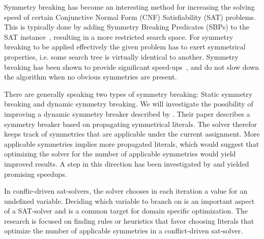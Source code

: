 Symmetry breaking has become an interesting method for increasing the solving speed of
certain Conjunctive Normal Form (CNF) Satisfiability (SAT) problems.
This is typically done by adding Symmetry Breaking Predicates (SBPs) to the SAT
instance~\cite{sakallah2009symmetry}, resulting in a more restricted search space.
For symmetry breaking to be applied effectively the given problem has to exert symmetrical
properties, i.e. some search tree is virtually identical to another.
Symmetry breaking has been shown to provide significant
speed-ups~\cite{darga2004exploiting,aloul2003solving}, and do not slow down the algorithm
when no obvious symmetries are present.

There are generally speaking two types of symmetry breaking: Static symmetry breaking and
dynamic symmetry breaking.
We will investigate the possibility of improving a dynamic symmetry breaker described by
\cite{devriendt2012symmetry}.
Their paper describes a symmetry breaker based on propagating symmetrical literals.
The solver therefor keeps track of symmetries that are applicable under the current assignment.
More applicable symmetries implies more propagated literals, which would suggest that
optimizing the solver for the number of applicable symmetries would yield improved results.
A step in this direction has been investigated by \cite{devriendt2012symmetry} and yielded
promising speedups.

In conflic-driven sat-solvers, the solver chooses in each iteration a value for an undefined
variable.
Deciding which variable to branch on is an important aspect of a SAT-solver and is a common target
for domain specific optimization\cite{een2004extensible}.
The research is focused on finding rules or heuristics that favor choosing literals
that optimize the number of applicable symmetries in a conflict-driven sat-solver.
